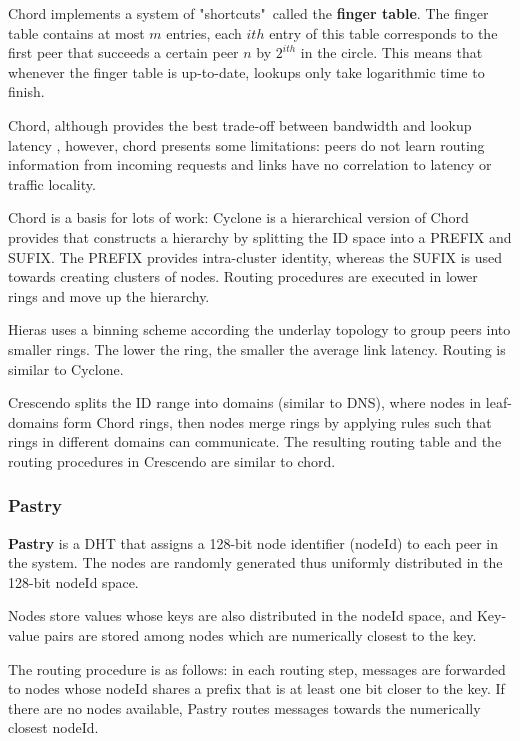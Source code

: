 Chord implements a system of "shortcuts"\ called the \textbf{finger table}. The finger table contains at most \(m\) entries, each $ith$ entry of this table corresponds to the first peer that succeeds a certain peer \(n\) by \(2^{ith}\) in the circle. This means that whenever the finger table is up-to-date, lookups only take logarithmic time to finish. 

Chord, although provides the best trade-off between bandwidth and lookup latency \cite{dht_performance_churn}, however, chord presents some limitations: peers do not learn routing information from incoming requests and links have no correlation to latency or traffic locality.

Chord is a basis for lots of work: Cyclone \cite{Artigas2005} is a hierarchical version of Chord provides that constructs a hierarchy by splitting the ID space into a PREFIX and SUFIX. The PREFIX provides intra-cluster identity, whereas the SUFIX is used towards creating clusters of nodes. Routing procedures are executed in lower rings and move up the hierarchy.  

Hieras \cite{1240580} uses a binning scheme according the underlay topology to group peers into smaller rings. The lower the ring, the smaller the average link latency. Routing is similar to Cyclone.

Crescendo \cite{Ganesan2004} splits the ID range into domains (similar to DNS), where nodes in leaf-domains form Chord rings, then nodes merge rings by applying rules such that rings in different domains can communicate. The resulting routing table and the routing procedures in Crescendo are similar to chord.

\subsubsection{Pastry}

\textbf{Pastry} \cite{rowstron2001pastry} is a DHT that assigns a 128-bit node identifier (nodeId) to each peer in the system. The nodes are randomly generated thus uniformly distributed in the 128-bit nodeId space. 

Nodes store values whose keys are also distributed in the nodeId space, and Key-value pairs are stored among nodes which are numerically closest to the key. 

The routing procedure is as follows: in each routing step, messages are forwarded to nodes whose nodeId shares a prefix that is at least one bit closer to the key. If there are no nodes available, Pastry routes messages towards the numerically closest nodeId. 

